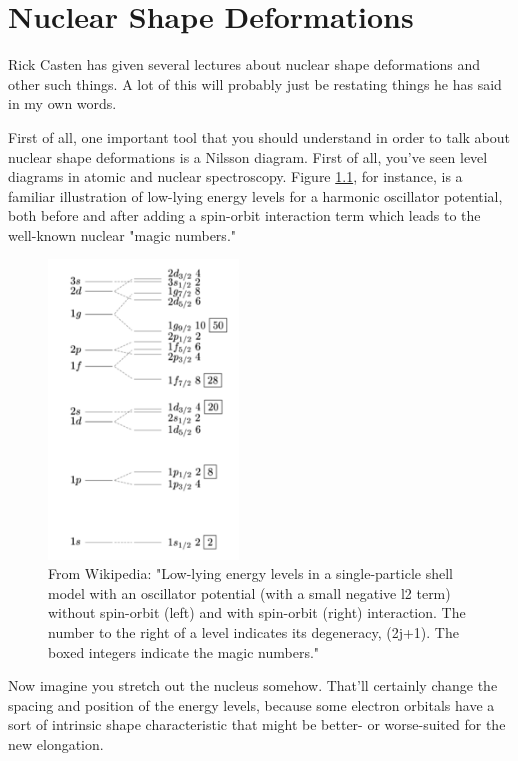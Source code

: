 \chapter{Nuclear Shape Deformations}

Rick Casten has given several lectures about nuclear shape deformations and other such things. A lot of this will probably just be restating things he has said in my own words.

First of all, one important tool that you should understand in order to talk about nuclear shape deformations is a Nilsson diagram. First of all, you've seen level diagrams in atomic and nuclear spectroscopy. Figure \ref{fig:NuclearShells}, for instance, is a familiar illustration of low-lying energy levels for a harmonic oscillator potential, both before and after adding a spin-orbit interaction term which leads to the well-known nuclear "magic numbers."

\begin{figure}
\includegraphics[width=0.45\textwidth]{TeX_files/NuclearShells}
\caption[Nuclear Shell Model level diagram]{From Wikipedia: "Low-lying energy levels in a single-particle shell model with an oscillator potential (with a small negative l2 term) without spin-orbit (left) and with spin-orbit (right) interaction. The number to the right of a level indicates its degeneracy, (2j+1). The boxed integers indicate the magic numbers."}
\label{fig:NuclearShells}
\end{figure}

Now imagine you stretch out the nucleus somehow. That'll certainly change the spacing and position of the energy levels, because some electron orbitals have a sort of intrinsic shape characteristic that might be better- or worse-suited for the new elongation.

